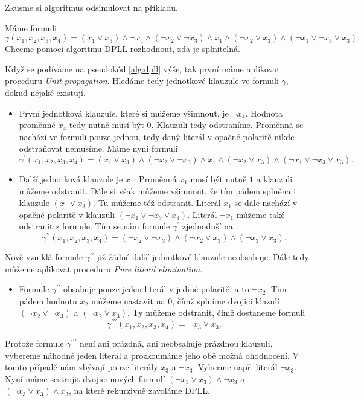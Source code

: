 Zkusme si algoritmus odsimulovat na příkladu.
\begin{example}
    Máme formuli
    \[\gamma(x_1,x_2,x_3,x_4)=(x_1\lor x_3)\land\neg x_4\land(\neg x_2\lor\neg x_3)\land x_1\land(\neg x_2\lor x_3)\land(\neg x_1\lor\neg x_3\lor x_3).\]
    Chceme pomocí algoritmu DPLL rozhodnout, zda je splnitelná.

    Když se podíváme na pseudokód \ref{alg:dpll} výše, tak první máme aplikovat proceduru \emph{Unit propagation}. Hledáme tedy jednotkové klauzule ve formuli $\gamma$, dokud nějaké existují.
    \begin{itemize}
        \item První jednotková klauzule, které si můžeme všimnout, je $\neg x_4$. Hodnota proměnné $x_4$ tedy nutně musí být $0$. Klauzuli tedy odstraníme. Proměnná se nachází ve formuli pouze jednou, tedy daný literál v opačné polaritě nikde odstraňovat nemusíme. Máme nyní formuli
        \[\gamma^\prime(x_1,x_2,x_3,x_4)=(x_1\lor x_3)\land(\neg x_2\lor\neg x_3)\land x_1\land(\neg x_2\lor x_3)\land(\neg x_1\lor\neg x_3\lor x_3).\]
        \item Další jednotková klauzule je $x_1$. Proměnná $x_1$ musí být nutně $1$ a klauzuli můžeme odstranit. Dále si však můžeme všimnout, že tím pádem splněna i klauzule $(x_1\lor x_3)$. Tu můžeme též odstranit. Literál $x_1$ se dále nachází v opačné polaritě v klauzuli $(\neg x_1\lor\neg x_3\lor x_3)$. Literál $\neg x_1$ můžeme také odstranit z formule. Tím se nám formule $\gamma^\prime$ zjednoduší na
        \[\gamma^{\prime\prime}(x_1,x_2,x_3,x_4)=(\neg x_2\lor\neg x_3)\land (\neg x_2\lor x_3)\land(\neg x_3\lor x_3).\]
    \end{itemize}
    Nově vzniklá formule $\gamma^{\prime\prime}$ již žádné další jednotkové klauzule neobsahuje. Dále tedy můžeme aplikovat proceduru \emph{Pure literal elimination}.
    \begin{itemize}
        \item Formule $\gamma^{\prime\prime}$ obsahuje pouze jeden literál v jediné polaritě, a to $\neg x_2$. Tím pádem hodnotu $x_2$ můžeme nastavit na $0$, čímž splníme dvojici klazulí $(\neg x_2\lor\neg x_3)$ a $(\neg x_2\lor x_3)$. Ty můžeme odstranit, čímž dostaneme formuli
        \[\gamma^{\prime\prime\prime}(x_1,x_2,x_3,x_4)=\neg x_3\lor x_3.\]
    \end{itemize}
    Protože formule $\gamma^{\prime\prime\prime}$ není ani prázdná, ani neobsahuje prázdnou klauzuli, vybereme náhodně jeden literál a prozkoumáme jeho obě možná ohodnocení. V tomto případě nám zbývají pouze literály $x_3$ a $\neg x_3$. Vyberme např. literál $\neg x_3$. Nyní máme sestrojit dvojici nových formulí $(\neg x_3\lor x_3)\land\neg x_3$ a $(\neg x_3\lor x_3)\land x_3$, na které rekurzivně zavoláme DPLL.

\end{example}
